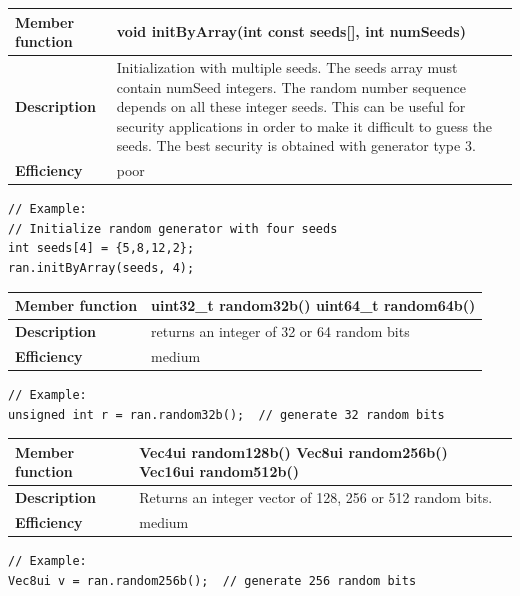 \documentclass[11pt,a4paper,oneside,openright]{report}
\newcommand{\vspacesmall}{\vspace{3mm}}
\begin{document}
\begin{tabular}{|p{30mm}|p{100mm}|}
\hline
\bfseries Member function & void initByArray(int const seeds[], int numSeeds) \\ \hline
\bfseries Description & Initialization with multiple seeds. The seeds array must contain numSeed integers. The random number sequence depends on all these integer seeds. This can be useful for security applications in order to make it difficult to guess the seeds. The best security is obtained with generator type 3. \\ \hline
\bfseries Efficiency & poor \\ \hline
\end{tabular}
\begin{lstlisting}[frame=none]
// Example:
// Initialize random generator with four seeds
int seeds[4] = {5,8,12,2};
ran.initByArray(seeds, 4);  
\end{lstlisting}
\vspacesmall

\begin{tabular}{|p{30mm}|p{100mm}|}
\hline
\bfseries Member function & uint32\_t random32b()\newline
uint64\_t random64b() \\ \hline
\bfseries Description & returns an integer of 32 or 64 random bits \\ \hline
\bfseries Efficiency & medium \\ \hline
\end{tabular}
\begin{lstlisting}[frame=none]
// Example:
unsigned int r = ran.random32b();  // generate 32 random bits
\end{lstlisting}
\vspacesmall

\begin{tabular}{|p{30mm}|p{100mm}|}
\hline
\bfseries Member function & Vec4ui random128b() \newline
Vec8ui random256b() \newline
Vec16ui random512b() \\ \hline
\bfseries Description & Returns an integer vector of 128, 256 or 512 random bits.  \\ \hline
\bfseries Efficiency & medium \\ \hline
\end{tabular}
\begin{lstlisting}[frame=none]
// Example:
Vec8ui v = ran.random256b();  // generate 256 random bits
\end{lstlisting}
\vspacesmall
\end{document}
